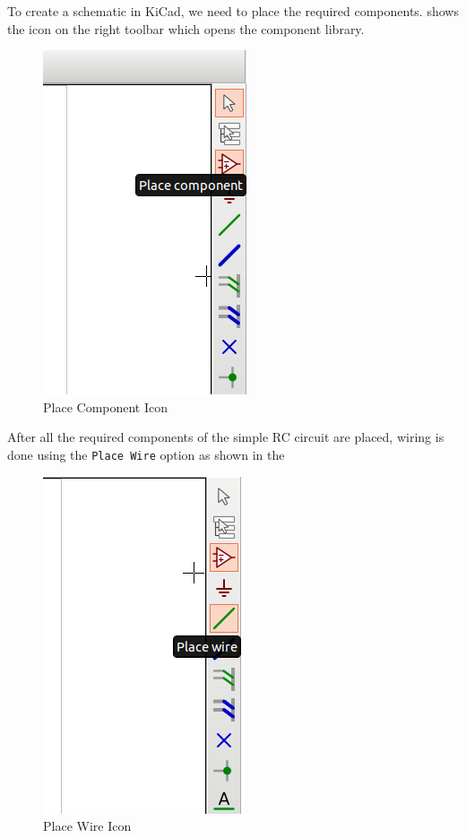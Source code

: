 \begin{itemize}
To create a schematic in KiCad, we need to place the required components.  shows the icon on the right toolbar which opens the component library.

\begin{figure}[!htp]
    \centering
    \includegraphics[width=\tnfig]{figures/rc_component.png}
    \caption{Place Component Icon}
    \label{rc_component}
\end{figure}

\pagebreak

After all the required components of the simple RC circuit are placed, wiring is done using the {\tt Place Wire} option as shown in the  

\begin{figure}[!htp]
    \centering
    \includegraphics[width=\tnfig]{figures/rc_wire.png}
    \caption{Place Wire Icon}
    \label{rc_wire}
\end{figure}


\end{itemize}
